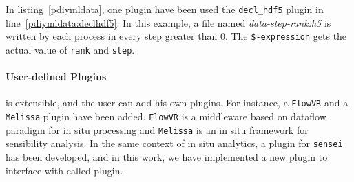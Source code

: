 In listing~\ref{pdiymldata}, one plugin have been used the \texttt{decl\_hdf5} plugin in line~\ref{pdiymldata:declhdf5}. In this example, a file named \textit{data-step-rank.h5} is written by each process in every step greater than 0. The \texttt{\$-expression} gets the actual value of \texttt{rank} and \texttt{step}.    

\paragraph{User-defined Plugins}
\pdi is extensible, and the user can add his own plugins. For instance, a \texttt{FlowVR} and a \texttt{Melissa} plugin have been added. \texttt{FlowVR}\cite{} is a middleware based on dataflow paradigm for in situ processing and \texttt{Melissa}\cite{} is an in situ framework for sensibility analysis. In the same context of in situ analytics, a plugin for \texttt{sensei} has been developed, and in this work, we have implemented a new plugin to interface with \dask called \deisa plugin.  




